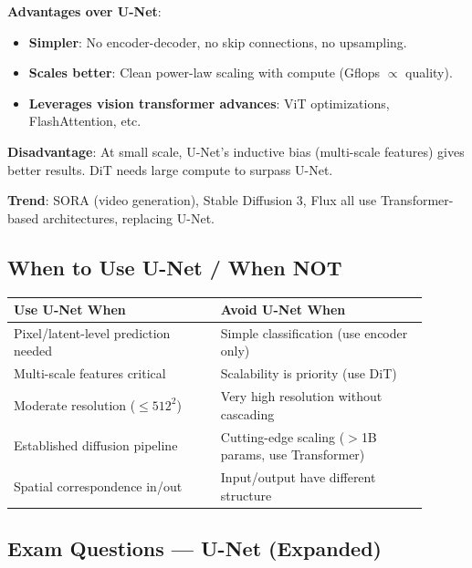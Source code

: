 \textbf{Advantages over U-Net}:
\begin{itemize}
\item \textbf{Simpler}: No encoder-decoder, no skip connections, no upsampling.
\item \textbf{Scales better}: Clean power-law scaling with compute (Gflops $\propto$ quality).
\item \textbf{Leverages vision transformer advances}: ViT optimizations, FlashAttention, etc.
\end{itemize}
\textbf{Disadvantage}: At small scale, U-Net's inductive bias (multi-scale features) gives better results. DiT needs large compute to surpass U-Net.

\textbf{Trend}: SORA (video generation), Stable Diffusion 3, Flux all use Transformer-based architectures, replacing U-Net.

\subsection{When to Use U-Net / When NOT}
\begin{center}\small
\begin{tabular}{p{0.45\linewidth}p{0.45\linewidth}}\toprule
\textbf{Use U-Net When} & \textbf{Avoid U-Net When} \\\midrule
Pixel/latent-level prediction needed & Simple classification (use encoder only) \\
Multi-scale features critical & Scalability is priority (use DiT) \\
Moderate resolution ($\leq 512^2$) & Very high resolution without cascading \\
Established diffusion pipeline & Cutting-edge scaling ($>$1B params, use Transformer) \\
Spatial correspondence in/out & Input/output have different structure \\
\bottomrule
\end{tabular}
\end{center}

\subsection{Exam Questions — U-Net (Expanded)}

